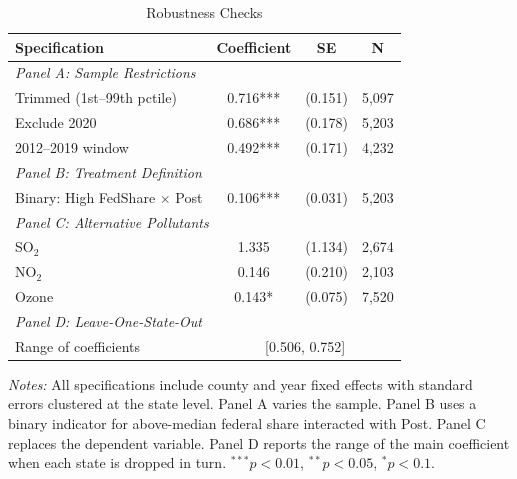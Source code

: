 \begin{table}[htbp]
\centering
\caption{Robustness Checks}
\label{tab:robustness}
\begin{tabular}{lccc}
\toprule
Specification & Coefficient & SE & N \\
\midrule
\multicolumn{4}{l}{\textit{Panel A: Sample Restrictions}} \\[3pt]
Trimmed (1st--99th pctile) & 0.716*** & (0.151) & 5,097 \\
Exclude 2020 & 0.686*** & (0.178) & 5,203 \\
2012--2019 window & 0.492*** & (0.171) & 4,232 \\[6pt]
\multicolumn{4}{l}{\textit{Panel B: Treatment Definition}} \\[3pt]
Binary: High FedShare $\times$ Post & 0.106*** & (0.031) & 5,203 \\[6pt]
\multicolumn{4}{l}{\textit{Panel C: Alternative Pollutants}} \\[3pt]
SO$_2$ & 1.335 & (1.134) & 2,674 \\
NO$_2$ & 0.146 & (0.210) & 2,103 \\
Ozone & 0.143* & (0.075) & 7,520 \\[6pt]
\multicolumn{4}{l}{\textit{Panel D: Leave-One-State-Out}} \\[3pt]
Range of coefficients & \multicolumn{3}{c}{[0.506, 0.752]} \\
\bottomrule
\end{tabular}
\par\vspace{4pt}\begin{minipage}{\textwidth}\footnotesize
\textit{Notes:} All specifications include county and year fixed effects with standard errors clustered at the state level. Panel A varies the sample. Panel B uses a binary indicator for above-median federal share interacted with Post. Panel C replaces the dependent variable. Panel D reports the range of the main coefficient when each state is dropped in turn. $^{***}p<0.01$, $^{**}p<0.05$, $^{*}p<0.1$.
\end{minipage}
\end{table}
